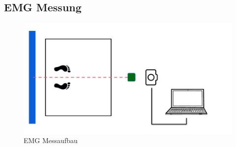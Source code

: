 

\subsection{EMG Messung}

\begin{figure}[h!]
    \centering
    \includegraphics[width=0.8\linewidth]{img/Aufbau-EMG.png}
    \caption{EMG Messaufbau}
    \label{fig:EMG-Messaufbau}
\end{figure}

